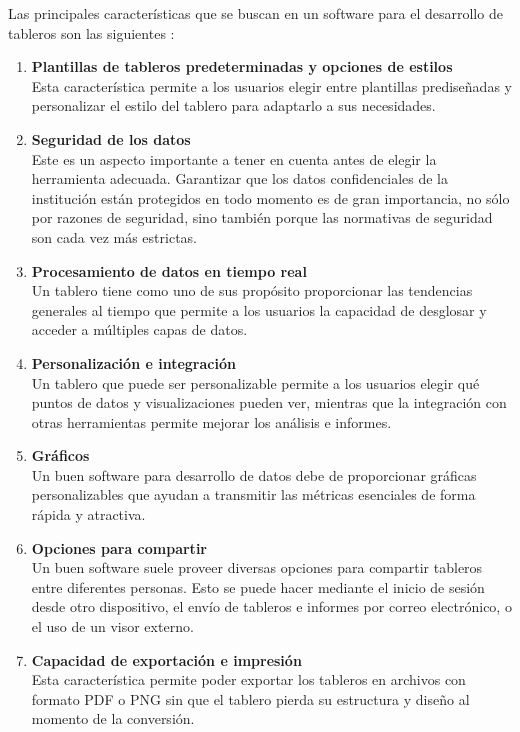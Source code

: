 Las principales características que se buscan en un software para el desarrollo de tableros son las siguientes \cite{wexler2017big}:

\begin{enumerate}
    \item \textbf{Plantillas de tableros predeterminadas y opciones de estilos}\\
    Esta característica permite a los usuarios elegir entre plantillas prediseñadas y personalizar el estilo del tablero para adaptarlo a sus necesidades.
    
    \item \textbf{Seguridad de los datos}\\
    Este es un aspecto importante a tener en cuenta antes de elegir la herramienta adecuada. Garantizar que los datos confidenciales de la institución están protegidos en todo momento es de gran importancia, no sólo por razones de seguridad, sino también porque las normativas de seguridad son cada vez más estrictas.
    
    \item \textbf{Procesamiento de datos en tiempo real}\\
    Un tablero tiene como uno de sus propósito proporcionar las tendencias generales al tiempo que permite a los usuarios la capacidad de desglosar y acceder a múltiples capas de datos.
    
    \item \textbf{Personalización e integración}\\
    Un tablero que puede ser personalizable permite a los usuarios elegir qué puntos de datos y visualizaciones pueden ver, mientras que la integración con otras herramientas permite mejorar los análisis e informes.

    
    \item \textbf{Gráficos}\\
    Un buen software para desarrollo de datos debe de proporcionar gráficas personalizables que ayudan a transmitir las métricas esenciales de forma rápida y atractiva.

    \item \textbf{Opciones para compartir}\\
    Un buen software suele proveer diversas opciones para compartir tableros entre diferentes personas. Esto se puede hacer mediante el inicio de sesión desde otro dispositivo, el envío de tableros e informes por correo electrónico, o el uso de un visor externo.

    \item \textbf{Capacidad de exportación e impresión}\\
    Esta característica permite poder exportar los tableros en archivos con formato PDF o PNG sin que el tablero pierda su estructura y diseño al momento de la conversión.
    
    
\end{enumerate}





